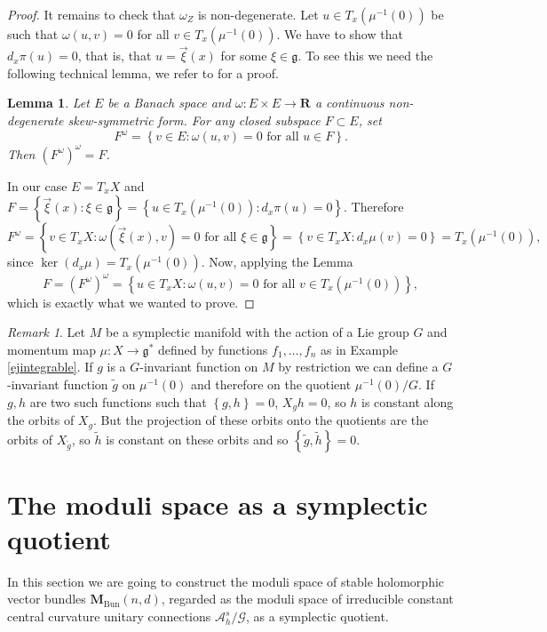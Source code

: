 \documentclass[12pt,a4paper]{book}
\newtheorem{lema}[thm]{Lemma}
\theoremstyle{definition} \newtheorem{defn}[thm]{Definition}
\theoremstyle{definition} \newtheorem{ejemplo}[thm]{Example}
\theoremstyle{remark} \newtheorem{rem}[thm]{Remark}
\def\AA{\mathscr{A}}
\def\GG{\mathscr{G}}
\def\gg{\mathfrak{g}}
\def\RR{\mathbf{R}}
\def\Bun{\mathbf{M}_{\mathrm{Bun}}}
\begin{document}
\begin{proof}
      It remains to check that $\omega_Z$ is non-degenerate. Let $u\in T_x(\mu^{-1}(0))$ be such that $\omega(u,v)=0$ for all $v\in T_x(\mu^{-1}(0))$. We have to show that $d_x\pi(u)=0$, that is, that $u=\vec{\xi}(x)$ for some $\xi\in \gg$. To see this we need the following technical lemma, we refer to \cite{kobayashi} for a proof.
      \begin{lema}
	Let $E$ be a Banach space and $\omega:E\times E \rightarrow \RR$ a continuous non-degenerate skew-symmetric form. For any closed subspace $F\subset E$, set
	\begin{equation*}
	  F^\omega=\left\{ v\in E:\omega(u,v)=0 \text{ for all } u \in F \right\}.
	\end{equation*}
	Then $(F^\omega)^\omega=F$.
      \end{lema}

      In our case $E=T_xX$ and $F=\left\{ \vec{\xi}(x) : \xi \in \gg \right\}=\left\{ u \in T_x(\mu^{-1}(0)) : d_x\pi(u)=0 \right\}$. Therefore
      \begin{equation*}
	F^\omega=\left\{ v\in T_xX: \omega(\vec{\xi}(x),v)=0 \text{ for all } \xi \in \gg \right\}=\left\{ v\in T_xX: d_x\mu(v)=0 \right\}=T_x(\mu^{-1}(0)),
      \end{equation*}
      since $\ker(d_x\mu)=T_x(\mu^{-1}(0))$. Now, applying the Lemma
      \begin{equation*}
	F=(F^\omega)^\omega=\left\{ u\in T_x X: \omega(u,v)=0 \text{ for all } v\in T_x(\mu^{-1}(0)) \right\},
      \end{equation*}
     which is exactly what we wanted to prove.
    \end{proof}

    \begin{rem}
      Let $M$ be a symplectic manifold with the action of a Lie group $G$ and momentum map $\mu:X\rightarrow \gg^*$ defined by functions $f_1,\dots,f_n$ as in Example \ref{ejintegrable}. If $g$ is a $G$-invariant function on $M$ by restriction we can define a $G$-invariant function $\tilde{g}$ on $\mu^{-1}(0)$ and therefore on the quotient $\mu^{-1}(0)/G$. If $g,h$ are two such functions such that $\left\{ g,h \right\}=0$, $X_gh=0$, so $h$ is constant along the orbits of $X_g$. But the projection of these orbits onto the quotients are the orbits of $X_{\tilde{g}}$, so $\tilde{h}$ is constant on these orbits and so $\left\{ \tilde{g},\tilde{h} \right\}=0$.
    \end{rem}

    \section{The moduli space as a symplectic quotient}
In this section we are going to construct the moduli space of stable holomorphic vector bundles $\Bun(n,d)$, regarded as the moduli space of irreducible constant central curvature unitary connections $\AA^s_h/\GG$, as a symplectic quotient. 
\end{document}
